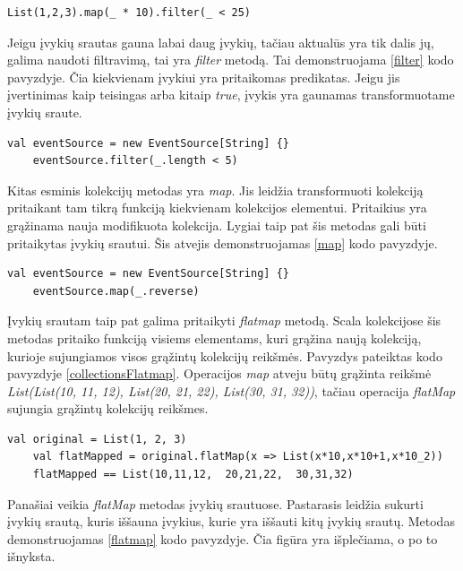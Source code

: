 \begin{lstlisting}[caption=- kolekcijos transformacijos, label=collectionTransformation]
	List(1,2,3).map(_ * 10).filter(_ < 25)
\end{lstlisting}

Jeigu įvykių srautas gauna labai daug įvykių, tačiau aktualūs yra tik dalis jų, galima naudoti filtravimą, tai yra \textit{filter} metodą. Tai demonstruojama \ref{filter} kodo pavyzdyje. Čia kiekvienam įvykiui yra pritaikomas predikatas. Jeigu jis įvertinimas kaip teisingas arba kitaip \textit{true}, įvykis yra gaunamas transformuotame įvykių sraute.

\begin{lstlisting}[caption=- įvykių srauto filtravimas, label=filter]
	val eventSource = new EventSource[String] {}
	eventSource.filter(_.length < 5)
\end{lstlisting}

Kitas esminis kolekcijų metodas yra \textit{map}. Jis leidžia transformuoti kolekciją pritaikant tam tikrą funkciją kiekvienam kolekcijos elementui. Pritaikius yra grąžinama nauja modifikuota kolekcija. Lygiai taip pat šis metodas gali būti pritaikytas įvykių srautui. Šis atvejis demonstruojamas \ref{map} kodo pavyzdyje. 

\begin{lstlisting}[caption=- įvykių visiškas transformavimas, label=map]
	val eventSource = new EventSource[String] {}
	eventSource.map(_.reverse)
\end{lstlisting}


Įvykių srautam taip pat galima pritaikyti \textit{flatmap} metodą. Scala kolekcijose šis metodas pritaiko funkciją visiems elementams, kuri grąžina naują kolekciją, kurioje sujungiamos visos grąžintų kolekcijų reikšmės. Pavyzdys pateiktas kodo pavyzdyje \ref{collectionsFlatmap}. Operacijos \textit{map} atveju būtų grąžinta reikšmė \textit{List(List(10, 11, 12), List(20, 21, 22), List(30, 31, 32))}, tačiau operacija \textit{flatMap} sujungia grąžintų kolekcijų reikšmes. 

\begin{lstlisting}[caption=- flatmap Scala kolekcijose, label=collectionsFlatmap]
	val original = List(1, 2, 3)
	val flatMapped = original.flatMap(x => List(x*10,x*10+1,x*10_2))
	flatMapped == List(10,11,12,  20,21,22,  30,31,32) 
\end{lstlisting}

Panašiai veikia \textit{flatMap} metodas įvykių srautuose. Pastarasis leidžia sukurti įvykių srautą, kuris iššauna įvykius, kurie yra iššauti kitų įvykių srautų. Metodas demonstruojamas \ref{flatmap} kodo pavyzdyje. Čia figūra yra išplečiama, o po to išnyksta.


